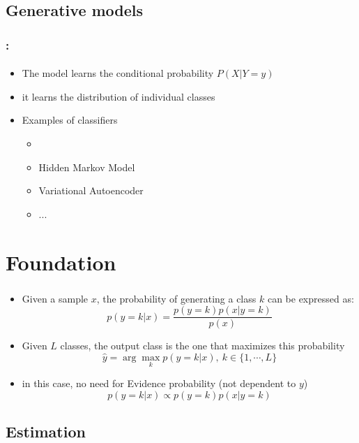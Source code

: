 \documentclass[xcolor=table]{beamer}
\begin{document}
\subsection{Generative models}

\begin{frame}
	\frametitle{\insertshortsubtitle: \insertsection}
	\framesubtitle{\insertsubsection}

	\begin{itemize}
		\item The model learns the conditional probability $P(X|Y=y)$
		\item it learns the distribution of individual classes
		\item Examples of classifiers
		\begin{itemize}
			\item {}
			\item Hidden Markov Model
			\item Variational Autoencoder
			\item...
		\end{itemize}
	\end{itemize}
	
\end{frame}

\section{Foundation}

\begin{frame}
	\frametitle{\insertshortsubtitle}
	\framesubtitle{\insertsection}
	
	\begin{itemize}
		\item Given a sample $ x $, the probability of generating a class $ k $ can be expressed as:
		\[p(y=k|x) = \frac{p(y=k) p(x|y=k)}{p(x)}\]
		\item Given $ L $ classes, the output class is the one that maximizes this probability
		\[\hat{y} = \arg\max_{k} p(y=k|x),\ k \in \{1, \cdots, L\} \]
		\item in this case, no need for Evidence probability (not dependent to $ y $)
		\[p(y=k|x) \propto p(y=k) p(x|y=k)\]
	\end{itemize}
	
\end{frame}

\subsection{Estimation}
\end{document}
